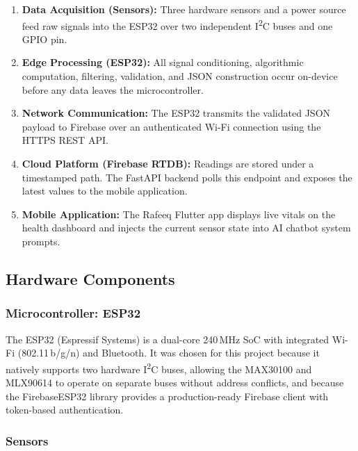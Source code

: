 \documentclass[12pt,a4paper]{report}
\begin{document}
\begin{enumerate}[leftmargin=*, label=\textbf{\arabic*.}]
  \item \textbf{Data Acquisition (Sensors):} Three hardware sensors and a power source
        feed raw signals into the ESP32 over two independent I\textsuperscript{2}C buses and
        one GPIO pin.

  \item \textbf{Edge Processing (ESP32):} All signal conditioning, algorithmic computation,
        filtering, validation, and JSON construction occur on-device before any data leaves
        the microcontroller.

  \item \textbf{Network Communication:} The ESP32 transmits the validated JSON payload to
        Firebase over an authenticated Wi-Fi connection using the HTTPS REST API.

  \item \textbf{Cloud Platform (Firebase RTDB):} Readings are stored under a
        timestamped path. The FastAPI backend polls this endpoint and exposes the latest
        values to the mobile application.

  \item \textbf{Mobile Application:} The Rafeeq Flutter app displays live vitals on the
        health dashboard and injects the current sensor state into AI chatbot system prompts.
\end{enumerate}

\subsection{Hardware Components}

\subsubsection{Microcontroller: ESP32}

The ESP32 (Espressif Systems) is a dual-core 240\,MHz SoC with integrated Wi-Fi
(802.11\,b/g/n) and Bluetooth. It was chosen for this project because it natively supports
two hardware I\textsuperscript{2}C buses, allowing the MAX30100 and MLX90614 to operate
on separate buses without address conflicts, and because the FirebaseESP32 library provides
a production-ready Firebase client with token-based authentication.

\subsubsection{Sensors}
\end{document}
